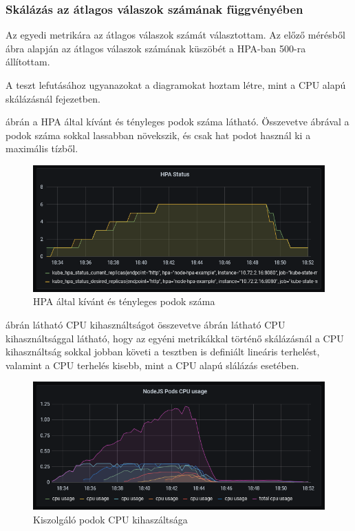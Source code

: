 \documentclass[a4paper,oneside]{article}
\begin{document}
\subsubsection{Skálázás az átlagos válaszok számának függvényében}
\label{secsec:custom_scaling}

Az egyedi metrikára az átlagos válaszok számát választottam.  Az előző
mérésből  ábra alapján az átlagos válaszok
számának küszöbét a HPA-ban 500-ra állítottam.

A teszt lefutásához ugyanazokat a diagramokat hoztam létre, mint a CPU alapú
skálázásnál  fejezetben.

 ábrán a HPA által kívánt és tényleges podok száma
látható.  Összevetve  ábrával a podok száma sokkal
lassabban növekszik, és csak hat podot használ ki a maximális tízből.

\begin{figure}[H]
  \centering
  \includegraphics[width=\textwidth]{light_custom_hpa.PNG}
  \caption{HPA által kívánt és tényleges podok száma}
  \label{light_custom_hpa}  
\end{figure}

 ábrán látható CPU kihasználtságot összevetve
 ábrán látható CPU kihasználtsággal látható, hogy az
egyéni metrikákkal történő skálázásnál a CPU kihasználtság sokkal jobban
követi a tesztben is definiált lineáris terhelést, valamint a CPU terhelés kisebb, mint a
CPU alapú slálázás esetében.

\begin{figure}[H]
  \centering
  \includegraphics[width=\textwidth]{light_custom_cpu.PNG}
  \caption{Kiszolgáló podok CPU kihaszáltsága}
  \label{light_custom_cpu}  
\end{figure}
\end{document}
